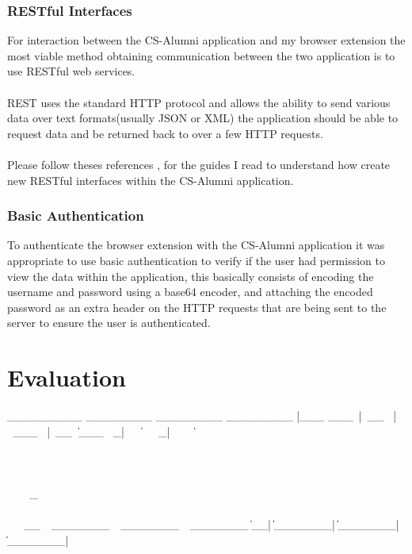 \documentclass{article}
\begin{document}
\subsubsection{RESTful Interfaces}
\label{sec:technology}

For interaction between the CS-Alumni application and my browser extension the most viable method obtaining communication between the two application is to use RESTful web services.\\
\\
REST uses the standard HTTP protocol and allows the ability to send various data over text formats(usually JSON or XML) the application should be able to request data and be returned back to over a few HTTP requests. \\
\\
Please follow theses references \cite[see reference][page \pageref{LastPage}]{bara:2013:online}, \cite[see reference][page \pageref{LastPage}]{saa:2013:online} for the guides I read to understand how create new RESTful interfaces within the CS-Alumni application.

\subsubsection{Basic Authentication}

To authenticate the browser extension with the CS-Alumni application it was appropriate to use basic authentication to verify if the user had permission to view the data within the application, this basically consists of encoding the username and password using a base64 encoder, and attaching the encoded password as an extra header on the HTTP requests that are being sent to the server to ensure the user is authenticated. \cite[see reference][page \pageref{LastPage}]{wp:2014:online}

\newpage
\section{Evaluation}

\iffalse
 _________    ________      ________      ________     
|\___   ___\ |\   __  \    |\   ___ \    |\   __  \    
\|___ \  \_| \ \  \|\  \   \ \  \_|\ \   \ \  \|\  \   
     \ \  \   \ \  \\\  \   \ \  \ \\ \   \ \  \\\  \  
      \ \  \   \ \  \\\  \   \ \  \_\\ \   \ \  \\\  \ 
       \ \__\   \ \_______\   \ \_______\   \ \_______\
        \|__|    \|_______|    \|_______|    \|_______|       
\end{document}
